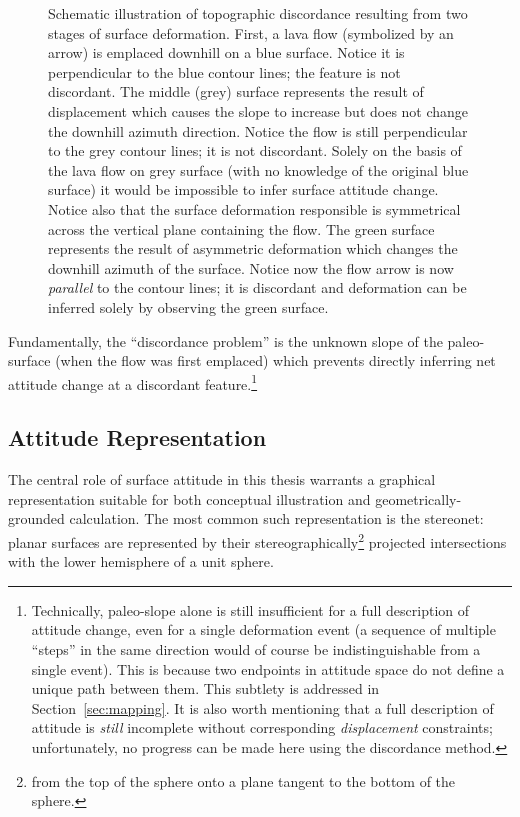 \begin{figure}
    \caption[Discordance \& attitude change]{Schematic illustration of topographic discordance resulting from two stages of surface deformation. First, a lava flow (symbolized by an arrow) is emplaced downhill on a blue surface. Notice it is perpendicular to the blue contour lines; the feature is not discordant. The middle (grey) surface represents the result of displacement which causes the slope to increase but does not change the downhill azimuth direction. Notice the flow is still perpendicular to the grey contour lines; it is not discordant. Solely on the basis of the lava flow on grey surface (with no knowledge of the original blue surface) it would be impossible to infer surface attitude change. Notice also that the surface deformation responsible is symmetrical across the vertical plane containing the flow. The green surface represents the result of asymmetric deformation which changes the downhill azimuth of the surface. Notice now the flow arrow is now \emph{parallel} to the contour lines; it is discordant and deformation can be inferred solely by observing the green surface.}%
    \label{fig:discordance-concept}
\end{figure}

Fundamentally, the ``discordance problem'' is the unknown slope of the paleo-surface (when the flow was first emplaced) which prevents directly inferring net attitude change at a discordant feature.\footnote{Technically, paleo-slope alone is still insufficient for a full description of attitude change, even for a single deformation event (a sequence of multiple ``steps'' in the same direction would of course be indistinguishable from a single event). This is because two endpoints in attitude space do not define a unique path between them. This subtlety is addressed in Section~\ref{sec:mapping}. It is also worth mentioning that a full description of attitude is \emph{still} incomplete without corresponding \emph{displacement} constraints; unfortunately, no progress can be made here using the discordance method.}

\subsection{Attitude Representation}\label{sec:attitude-representation}

The central role of surface attitude in this thesis warrants a graphical representation suitable for both conceptual illustration and geometrically-grounded calculation. The most common such representation is the stereonet: planar surfaces are represented by their stereographically\footnote{from the top of the sphere onto a plane tangent to the bottom of the sphere.} projected intersections with the lower hemisphere of a unit sphere.

